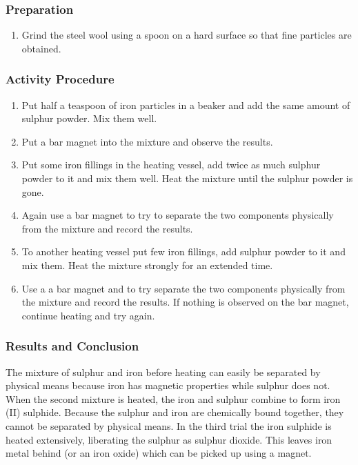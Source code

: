 \subsubsection*{Preparation}
\begin{enumerate}
\item{Grind the steel wool using a spoon on a hard surface so that fine particles are obtained.}
\end{enumerate}

\subsubsection*{Activity Procedure}
\begin{enumerate}
\item{Put half a teaspoon of iron particles in a beaker and add the same amount of sulphur powder. Mix them well.}
\item{Put a bar magnet into the mixture and observe the results.}
\item{Put some iron fillings in the heating vessel, add twice as much sulphur powder to it and mix them well. Heat the mixture until the sulphur powder is gone.}
\item{Again use a bar magnet to try to separate the two components physically from the mixture and record the results.}
\item{To another heating vessel put few iron fillings, add sulphur powder to it and mix them. Heat the mixture strongly for an extended time.}
\item{Use a a bar magnet and to try separate the two components physically from the mixture and record the results. If nothing is observed on the bar magnet, continue heating and try again.}
\end{enumerate}

\subsubsection*{Results and Conclusion}
The mixture of sulphur and iron before heating can easily be separated by physical means because iron has magnetic properties while sulphur does not. When the second mixture is heated, the iron and sulphur combine to form iron (II) sulphide. Because the sulphur and iron are chemically bound together, they cannot be separated by physical means. In the third trial the iron sulphide is heated extensively, liberating the sulphur as sulphur dioxide. This leaves iron metal behind (or an iron oxide) which can be picked up using a magnet.

